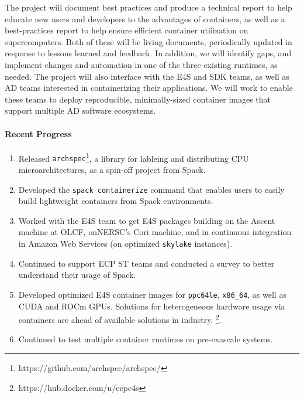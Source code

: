 The project will document best practices and produce a technical report
to help educate new users and developers to the advantages of containers,
as well as a best-practices report to help ensure efficient container
utilization on supercomputers. Both of these will be living
documents, periodically updated in response to lessons learned and
feedback.  In addition, we will identify gaps, and implement changes and
automation in one of the three existing runtimes, as needed.  The project
will also interface with the E4S and SDK teams, as well as AD teams
interested in containerizing their applications. We will work to enable
these teams to deploy reproducible, minimally-sized container images that
support multiple AD software ecosystems.

\paragraph{Recent Progress}

\begin{enumerate}
\item Released {\tt archspec}\footnote{https://github.com/archspec/archspec/},
      a library for lableing and distributing CPU microarchitectures, as a
      spin-off project from Spack.

\item Developed the {\tt spack containerize} command that enables users to
      easily build lightweight containers from Spack environments.

\item Worked with the E4S team to get E4S packages building on the Ascent
      machine at OLCF, onNERSC's Cori machine, and in continuous integration in
      Amazon Web Services (on optimized {\tt skylake} instances).

\item Continued to support ECP ST teams and conducted a survey to better
      understand their usage of Spack.

\item Developed optimized E4S container images for {\tt ppc64le},
      {\tt x86\_64}, as well as CUDA and ROCm GPUs. Solutions for
      heterogeneous hardware usage via containers are ahead of available
      solutions in industry. \footnote{https://hub.docker.com/u/ecpe4s}.

\item Continued to test multiple container runtimes on pre-exascale systems.
\end{enumerate}

